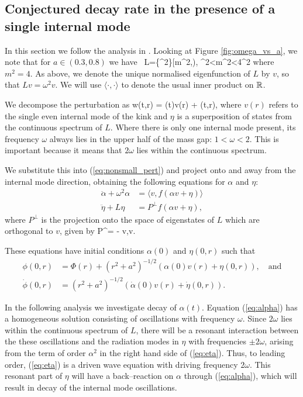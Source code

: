 \subsection{Conjectured decay rate in the presence of a single internal mode} \label{sec:conjecture}
In this section we follow the analysis in \cite{SG}. Looking at Figure \ref{fig:omega_vs_a}, we note that for $a\in(0.3,0.8)$ we have
\be \label{eq:spec_L}
\ L=\{\omega^2\}\cap [m^2,\infty), \qquad \omega^2<m^2<4\omega^2
\ee
where $m^2=4$. As above, we denote the unique normalised eigenfunction of $L$ by $v$, so that $Lv=\omega^2v$. We will use $\langle\cdot,\cdot\rangle$ to denote the usual inner product on $\mathbb{R}$.

We decompose the perturbation as
\be
w(t,r) = \alpha(t)v(r) + \eta(t,r),
\ee
where $v(r)$ refers to the single even internal mode of the kink and $\eta$ is a superposition of states from the continuous spectrum of $L$. Where there is only one internal mode present, its frequency $\omega$ always lies in the upper half of the mass gap: $1<\omega<2$. This is important because it means that $2\omega$ lies within the continuous spectrum.

We substitute this into (\ref{eq:nonsmall_pert}) and project onto and away from the internal mode direction, obtaining the following equations for $\alpha$ and $\eta$:
\begin{align}
\ddot{\alpha} + \omega^2\alpha &= \langle v, f(\alpha v + \eta) \rangle \label{eq:alpha}\\
\ddot{\eta} + L\eta &= P^\perp f(\alpha v + \eta),\label{eq:eta}
\end{align}
where $P^\perp$ is the projection onto the space of eigenstates of $L$ which are orthogonal to $v$, given by
\be \label{eq:Pperp}
P^\perp\psi = \psi - \langle v,\psi\rangle v.
\ee

These equations have initial conditions $\alpha(0)$ and $\eta(0,r)$ such that
\begin{align*}
\phi(0,r) &= \Phi(r) + (r^2+a^2)^{-1/2}(\alpha(0)v(r) + \eta(0,r)), \quad \mathrm{and} \\
\dot{\phi}(0,r) &= (r^2+a^2)^{-1/2}(\dot{\alpha}(0)v(r) + \dot{\eta}(0,r)).
\end{align*}

In the following analysis we investigate decay of $\alpha(t)$. Equation (\ref{eq:alpha}) has a homogeneous solution consisting of oscillations with frequency $\omega$. Since $2\omega$ lies within the continuous spectrum of $L$, there will be a resonant interaction between the these oscillations and the radiation modes in $\eta$ with frequencies $\pm 2 \omega$, arising from the term of order $\alpha^2$ in the right hand side of (\ref{eq:eta}). Thus, to leading order, (\ref{eq:eta}) is a driven wave equation with driving frequency $2\omega$. This resonant part of $\eta$ will have a back--reaction on $\alpha$ through (\ref{eq:alpha}), which will result in decay of the internal mode oscillations.

